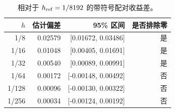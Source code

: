 \begin{table}[H]\centering\small
\caption{相对于 $h_{\rm ref}=1/8192$ 的带符号配对收益差。}\label{tab:na-weak-cn}
\begin{tabular}{rrrr}\toprule
$h$ & 估计偏差 & 95\% 区间 & 是否排除零\\\midrule
1/8 & 0.02579 & [0.01672, 0.03486] & 是\\
1/16 & 0.01048 & [0.00405, 0.01691] & 是\\
1/32 & 0.00540 & [0.00089, 0.00991] & 是\\
1/64 & 0.00172 & [-0.00148, 0.00492] & 否\\
1/128 & 0.00096 & [-0.00130, 0.00322] & 否\\
1/256 & 0.00034 & [-0.00124, 0.00192] & 否\\
\bottomrule\end{tabular}
\end{table}
